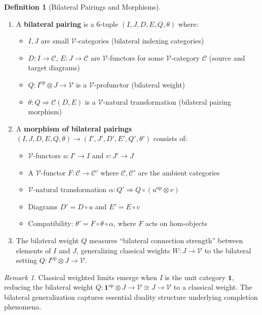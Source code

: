 \documentclass[11pt]{article}
\theoremstyle{plain}
\theoremstyle{definition}
\newtheorem{definition}[theorem]{Definition}
\theoremstyle{remark}
\newtheorem{remark}[theorem]{Remark}
\newcommand{\V}{\mathcal{V}}
\newcommand{\C}{\mathcal{C}}
\newcommand{\op}{\mathrm{op}}
\begin{document}
\begin{definition}[Bilateral Pairings and Morphisms]\label{def:bilateral-pairing}
\begin{enumerate}
\item A \textbf{bilateral pairing} is a 6-tuple $(I, J, D, E, Q, \theta)$ where:
\begin{itemize}
\item $I, J$ are small $\V$-categories (bilateral indexing categories)
\item $D : I \to \C$, $E : J \to \C$ are $\V$-functors for some $\V$-category $\C$ (source and target diagrams)
\item $Q : I^{\op} \otimes J \to \V$ is a $\V$-profunctor (bilateral weight)
\item $\theta : Q \Rightarrow \C(D, E)$ is a $\V$-natural transformation (bilateral pairing morphism)
\end{itemize}

\item A \textbf{morphism of bilateral pairings} $(I, J, D, E, Q, \theta) \to (I', J', D', E', Q', \theta')$ consists of:
\begin{itemize}
\item $\V$-functors $u : I' \to I$ and $v : J' \to J$
\item A $\V$-functor $F : \C \to \C'$ where $\C, \C'$ are the ambient categories
\item $\V$-natural transformation $\alpha : Q' \Rightarrow Q \circ (u^{\op} \otimes v)$
\item Diagrams $D' = D \circ u$ and $E' = E \circ v$
\item Compatibility: $\theta' = F \circ \theta \circ \alpha$, where $F$ acts on hom-objects
\end{itemize}

\item The bilateral weight $Q$ measures ``bilateral connection strength'' between elements of $I$ and $J$, generalizing classical weights $W : J \to \V$ to the bilateral setting $Q : I^{\op} \otimes J \to \V$.
\end{enumerate}
\end{definition}

\begin{remark}
Classical weighted limits emerge when $I$ is the unit category $\mathbf{1}$, reducing the bilateral weight $Q : \mathbf{1}^{\op} \otimes J \to \V \cong J \to \V$ to a classical weight. The bilateral generalization captures essential duality structure underlying completion phenomena.
\end{remark}
\end{document}
